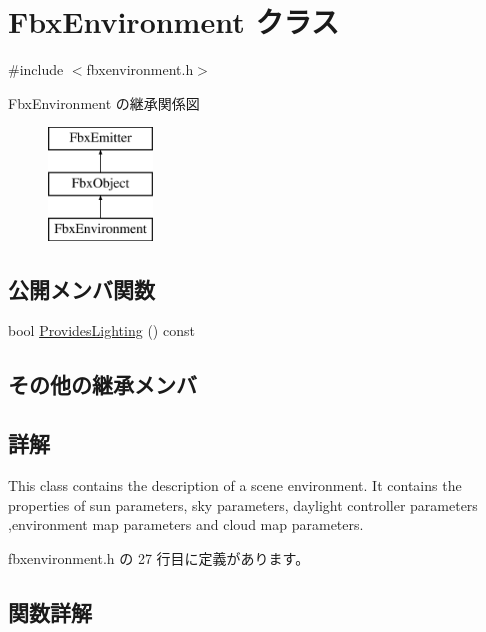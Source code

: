 \hypertarget{class_fbx_environment}{}\section{Fbx\+Environment クラス}
\label{class_fbx_environment}


{\ttfamily \#include $<$fbxenvironment.\+h$>$}

Fbx\+Environment の継承関係図\begin{figure}[H]
\begin{center}
\leavevmode
\includegraphics[height=3.000000cm]{class_fbx_environment}
\end{center}
\end{figure}
\subsection*{公開メンバ関数}
\begin{DoxyCompactItemize}
\item 
bool \hyperlink{class_fbx_environment_a5665a3c24b1b886fb8e00cc4db1fef14}{Provides\+Lighting} () const
\end{DoxyCompactItemize}
\subsection*{その他の継承メンバ}


\subsection{詳解}
This class contains the description of a scene environment. It contains the properties of sun parameters, sky parameters, daylight controller parameters ,environment map parameters and cloud map parameters. 

 fbxenvironment.\+h の 27 行目に定義があります。



\subsection{関数詳解}
\mbox{\label{class_fbx_environment_a5665a3c24b1b886fb8e00cc4db1fef14}} 
